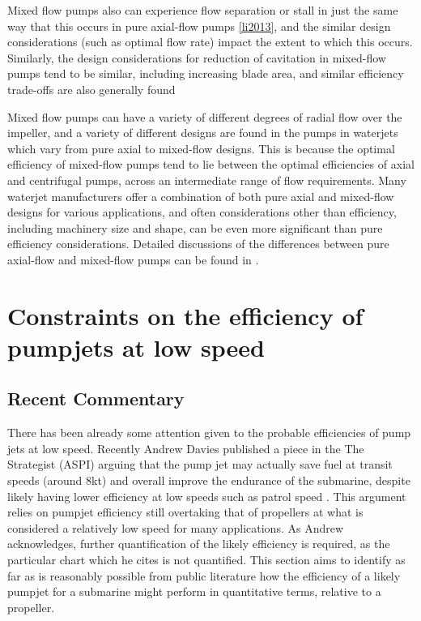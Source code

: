 \documentclass{article}\usepackage[]{graphicx}\usepackage[]{color}
\begin{document}
Mixed flow pumps also can experience flow separation or stall in just the same way that this occurs in pure axial-flow pumps \ref{li2013}, and the similar design considerations (such as optimal flow rate) impact the extent to which this occurs. Similarly, the design considerations for reduction of cavitation in mixed-flow pumps tend to be similar, including increasing blade area, and similar efficiency trade-offs are also generally found \parencite{hamilton1997}

Mixed flow pumps can have a variety of different degrees of radial flow over the impeller, and a variety of different designs are found in the pumps in waterjets which vary from pure axial to mixed-flow designs. This is because the optimal efficiency of mixed-flow pumps tend to lie between the optimal efficiencies of axial and centrifugal pumps, across an intermediate range of flow requirements.  Many waterjet manufacturers offer a combination of both pure axial and mixed-flow designs for various applications, and often considerations other than efficiency, including machinery size and shape, can be even more significant than pure efficiency considerations.  Detailed discussions of the differences between pure axial-flow and mixed-flow pumps can be found in \cite{wislicenus1986}.

\newpage  \section{Constraints on the efficiency of pumpjets at low speed}

\subsection{Recent Commentary}
There has been already some attention given to the probable efficiencies of pump jets at low speed. Recently Andrew Davies published a piece in the The Strategist (ASPI) arguing that the pump jet may actually save fuel at transit speeds (around 8kt) and overall improve the endurance of the submarine, despite likely having lower efficiency at low speeds such as patrol speed \parencite{davies2017}.  This argument relies on pumpjet efficiency still overtaking that of propellers at what is considered a relatively low speed for many applications.  As Andrew acknowledges, further quantification of the likely efficiency is required, as the particular chart which he cites is not quantified.  This section aims to identify as far as is reasonably possible from public literature how the efficiency of a likely pumpjet for a submarine might perform in quantitative terms, relative to a propeller.
\end{document}
